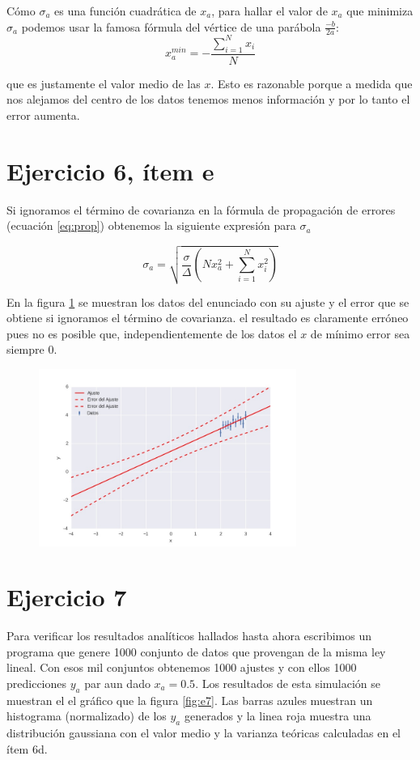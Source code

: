 \documentclass{article}
\begin{document}
Cómo $\sigma_a$ es una función cuadrática de $x_a$, para hallar el valor de $x_a$ que minimiza $\sigma_a$ podemos usar la famosa fórmula del vértice de una parábola $\frac{-b}{2a}$:
$$
x_a^{min} = -\frac{\sum_{i=1}^N x_i}{N}
$$

que es justamente el valor medio de las $x$. 
Esto es razonable porque a medida que nos alejamos del centro de los datos tenemos menos información y por lo tanto el error aumenta. 

\section*{Ejercicio 6, ítem e}
Si ignoramos el término de covarianza en la fórmula de propagación de errores (ecuación \ref{eq:prop}) obtenemos la siguiente expresión para $\sigma_a$ 

$$
\sigma_a = \sqrt{\frac{\sigma}{\Delta}(N x_a^2 + \sum_{i=1}^N x_i^2)}
$$

En la figura \ref{fig:e6e} se muestran los datos del enunciado con su ajuste y el error que se obtiene si ignoramos el término de covarianza. 
el resultado es claramente erróneo pues no es posible que, independientemente de los datos el $x$ de mínimo error sea siempre $0$.

\begin{figure}
\centering
\includegraphics[width=0.75\textwidth]{ej6e.jpg}
\caption[]{}
\label{fig:e6e}
\end{figure}

\section*{Ejercicio 7}
Para verificar los resultados analíticos hallados hasta ahora escribimos un programa que genere 1000 conjunto de datos que provengan de la misma ley lineal.
Con esos mil conjuntos obtenemos 1000 ajustes y con ellos 1000 predicciones $y_a$ par aun dado $x_a=0.5$.
Los resultados de esta simulación se muestran el el gráfico que la figura \ref{fig:e7}.
Las barras azules muestran un histograma (normalizado) de los $y_a$ generados y la linea roja muestra una distribución gaussiana con el valor medio y la varianza teóricas calculadas en el ítem 6d. 
\end{document}
